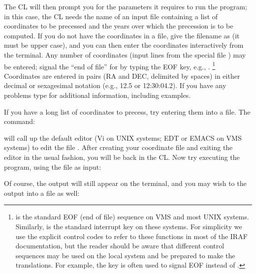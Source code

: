 \noindent
The CL will then prompt you for the parameters it requires to run the program;
in this case, the CL needs the name of an input file containing a list
of coordinates to be precessed and the years over which the
precession is to be computed.  If you do not have the coordinates in a
file, give the filename as  (it must be upper case), and 
you can then enter the coordinates interactively from the terminal.
Any number of coordinates (input lines from the special file )
may be entered; signal the ``end of file'' for  by typing
the EOF key, e.g., .
\footnote { is the standard EOF (end of file)
sequence on VMS and most UNIX systems.  Similarly,  is the
standard interrupt key on these systems.  For simplicity we use the explicit
control codes to refer to these functions in most of the IRAF documentation,
but the reader should be aware that different control sequences may be used
on the local system and be prepared to make the translations.  For example,
the key  is often used to signal EOF instead of .}
Coordinates are entered in pairs (RA and DEC, delimited by spaces) in either
decimal or sexagesimal notation (e.g., 12.5 or 12:30:04.2).  If you have any
problems type  for additional information, including
examples.

If you have a long list of coordinates to precess, try entering
them into a file.  The command:

\begin{quotation}\noindent
{} 
\end{quotation}

\noindent
will call up the default editor (Vi on UNIX systems; EDT or EMACS on VMS
systems) to edit the file .
After creating your coordinate file and exiting the editor in the usual
fashion, you will be back in the CL.  Now try executing the 
program, using the file  as input:

\begin{quotation}\noindent
{} 
\end{quotation}

\noindent
Of course, the output will still appear on the terminal, and
you may wish to  the output into a file as well:

\begin{quotation}\noindent
{} 
\end{quotation}

